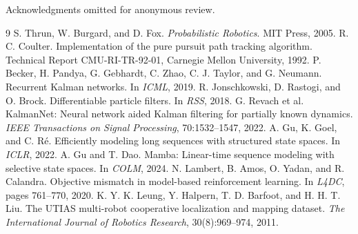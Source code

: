 \documentclass{article}
\begin{document}
\begin{ack}
Acknowledgments omitted for anonymous review.
\end{ack}
\begin{thebibliography}{9}
\small
{}
S. Thrun, W. Burgard, and D. Fox. \emph{Probabilistic Robotics}. MIT Press, 2005.
R. C. Coulter. Implementation of the pure pursuit path tracking algorithm. Technical Report CMU-RI-TR-92-01, Carnegie Mellon University, 1992.
P. Becker, H. Pandya, G. Gebhardt, C. Zhao, C. J. Taylor, and G. Neumann. Recurrent Kalman networks. In \emph{ICML}, 2019.
R. Jonschkowski, D. Rastogi, and O. Brock. Differentiable particle filters. In \emph{RSS}, 2018.
G. Revach et al. KalmanNet: Neural network aided Kalman filtering for partially known dynamics. \emph{IEEE Transactions on Signal Processing}, 70:1532--1547, 2022.
A. Gu, K. Goel, and C. R\'e. Efficiently modeling long sequences with structured state spaces. In \emph{ICLR}, 2022.
A. Gu and T. Dao. Mamba: Linear-time sequence modeling with selective state spaces. In \emph{COLM}, 2024.
N. Lambert, B. Amos, O. Yadan, and R. Calandra. Objective mismatch in model-based reinforcement learning. In \emph{L4DC}, pages 761--770, 2020.
K. Y. K. Leung, Y. Halpern, T. D. Barfoot, and H. H. T. Liu. The UTIAS multi-robot cooperative localization and mapping dataset. \emph{The International Journal of Robotics Research}, 30(8):969--974, 2011.
\end{thebibliography}
\end{document}
